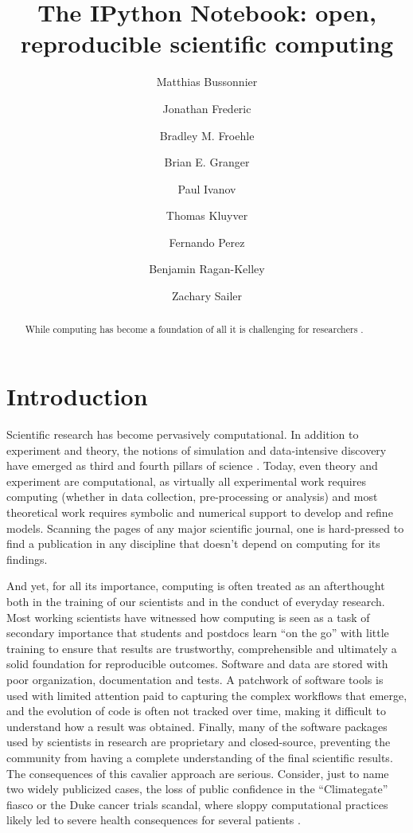 \documentclass[12pt]{article}
\title{The IPython Notebook: open, reproducible scientific computing}
\author[1]{Matthias Bussonnier}
\author[2]{Jonathan Frederic}
\author[3]{Bradley M. Froehle}
\author[2]{Brian E. Granger}
\author[3]{Paul Ivanov}
\author[3]{Thomas Kluyver}
\author[3]{Fernando Perez}
\author[3]{Benjamin Ragan-Kelley}
\author[2]{Zachary Sailer}
\affil[1]{Affiliation of Matthias}
\affil[2]{Cal Poly State University}
\affil[3]{University of CA, Berkeley}
\begin{document}
\maketitle

\begin{abstract}
While computing has become a foundation of all it is challenging for researchers . 
\end{abstract}

\section{Introduction}

Scientific research has become pervasively computational. In addition
to experiment and theory, the notions of simulation and data-intensive
discovery have emerged as third and fourth pillars of science \cite{4th-paradigm}.
Today, even theory and experiment are computational, as virtually
all experimental work requires computing (whether in data collection,
pre-processing or analysis) and most theoretical work requires symbolic
and numerical support to develop and refine models. Scanning the pages
of any major scientific journal, one is hard-pressed to find a publication
in any discipline that doesn't depend on computing for its findings.

And yet, for all its importance, computing is often treated as an 
afterthought both in the training of our scientists and in the conduct
of everyday research. Most working scientists have witnessed how computing
is seen as a task of secondary importance that students and postdocs
learn ``on the go'' with little training to ensure that results
are trustworthy, comprehensible and ultimately a solid foundation
for reproducible outcomes. Software and data are stored with poor
organization, documentation and tests. A patchwork of software tools
is used with limited attention paid to capturing the complex workflows
that emerge, and the evolution of code is often not tracked over time,
making it difficult to understand how a result was obtained. Finally,
many of the software packages used by scientists in research are proprietary
and closed-source, preventing the community from having a complete
understanding of the final scientific results. The consequences of
this cavalier approach are serious. Consider, just to name two widely
publicized cases, the loss of public confidence in the ``Climategate''
fiasco \cite{Hef10} or the Duke cancer trials scandal, where sloppy
computational practices likely led to severe health consequences for
several patients \cite{Cou10}. 
\end{document}
